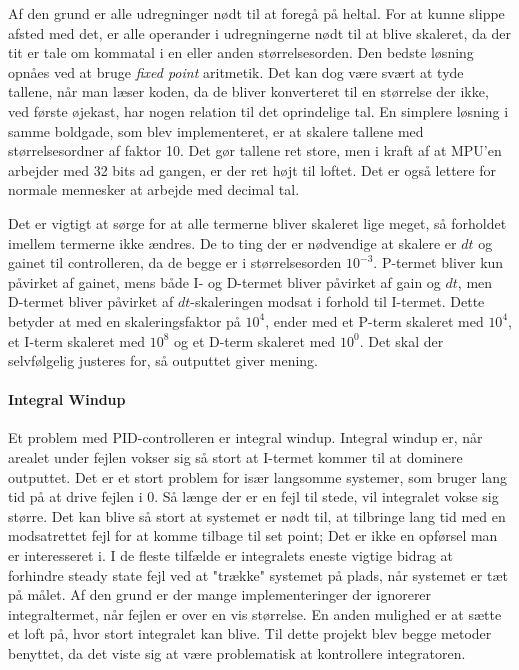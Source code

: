 Af den grund er alle udregninger nødt til at foregå på heltal. For at kunne slippe afsted med det, er alle operander i udregningerne nødt til at blive skaleret, da der tit er tale om kommatal i en eller anden størrelsesorden. Den bedste løsning opnåes ved at bruge \textit{fixed point} aritmetik. Det kan dog være svært at tyde tallene, når man læser koden, da de bliver konverteret til en størrelse der ikke, ved første øjekast, har nogen relation til det oprindelige tal. En simplere løsning i samme boldgade, som blev implementeret, er at skalere tallene med størrelsesordner af faktor 10. Det gør tallene ret store, men i kraft af at MPU'en arbejder med 32 bits ad gangen, er der ret højt til loftet. Det er også lettere for normale mennesker at arbejde med decimal tal.

Det er vigtigt at sørge for at alle termerne bliver skaleret lige meget, så forholdet imellem termerne ikke ændres. De to ting der er nødvendige at skalere er $dt$ og gainet til controlleren, da de begge er i størrelsesorden $10^{-3}$. P-termet bliver kun påvirket af gainet, mens både I- og D-termet bliver påvirket af gain og $dt$, men D-termet bliver påvirket af $dt$-skaleringen modsat i forhold til I-termet. Dette betyder at med en skaleringsfaktor på $10^4$, ender med et P-term skaleret med $10^4$, et I-term skaleret med $10^8$ og et D-term skaleret med $10^0$. Det skal der selvfølgelig justeres for, så outputtet giver mening.

\paragraph{Integral Windup}

Et problem med PID-controlleren er integral windup. Integral windup er, når arealet under fejlen vokser sig så stort at I-termet kommer til at dominere outputtet. Det er et stort problem for især langsomme systemer, som bruger lang tid på at drive fejlen i 0. Så længe der er en fejl til stede, vil integralet vokse sig større. Det kan blive så stort at systemet er nødt til, at tilbringe lang tid med en modsatrettet fejl for at komme tilbage til set point; Det er ikke en opførsel man er interesseret i. I de fleste tilfælde er integralets eneste vigtige bidrag at forhindre steady state fejl ved at "trække" systemet på plads, når systemet er tæt på målet. Af den grund er der mange implementeringer der ignorerer integraltermet, når fejlen er over en vis størrelse. En anden mulighed er at sætte et loft på, hvor stort integralet kan blive. Til dette projekt blev begge metoder benyttet, da det viste sig at være problematisk at kontrollere integratoren.

